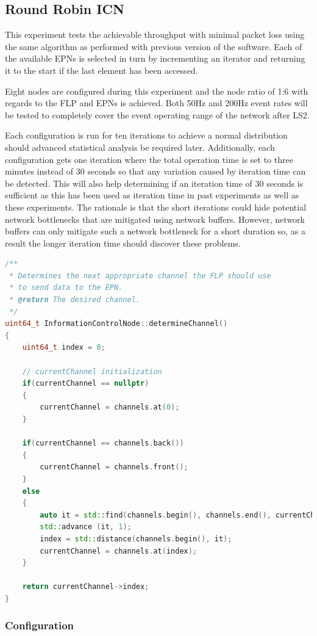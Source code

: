 \documentclass[]{article}
\begin{document}
\subsection{Round Robin ICN}
This experiment tests the achievable throughput with minimal packet loss using the same algorithm as performed with previous version of the software. Each of the available EPNs is selected in turn by incrementing an iterator and returning it to the start if the last element has been accessed. 

Eight nodes are configured during this experiment and the node ratio of 1:6 with regards to the FLP and EPNs is achieved. Both 50Hz and 200Hz event rates will be tested to completely cover the event operating range of the network after LS2.

Each configuration is run for ten iterations to achieve a normal distribution should advanced statistical analysis be required later. Additionally, each configuration gets one iteration where the total operation time is set to three minutes instead of 30 seconds so that any variation caused by iteration time can be detected. This will also help determining if an iteration time of 30 seconds is sufficient as this has been used as iteration time in past experiments as well as these experiments. The rationale is that the short iterations could hide potential network bottlenecks that are mitigated using network buffers. However, network buffers can only mitigate such a network bottleneck for a short duration so, as a result the longer iteration time should discover these problems.


\begin{lstlisting}[language=C++]
/**
 * Determines the next appropriate channel the FLP should use 
 * to send data to the EPN.
 * @return The desired channel.
 */
uint64_t InformationControlNode::determineChannel()
{
	uint64_t index = 0;

	// currentChannel initialization 
	if(currentChannel == nullptr)
	{
		currentChannel = channels.at(0);
	}

	if(currentChannel == channels.back())
	{
		currentChannel = channels.front();
	}
	else 
	{
		auto it = std::find(channels.begin(), channels.end(), currentChannel);
		std::advance (it, 1);
		index = std::distance(channels.begin(), it);
		currentChannel = channels.at(index);
	}

	return currentChannel->index;
}
\end{lstlisting}

\subsubsection{Configuration}
\end{document}
